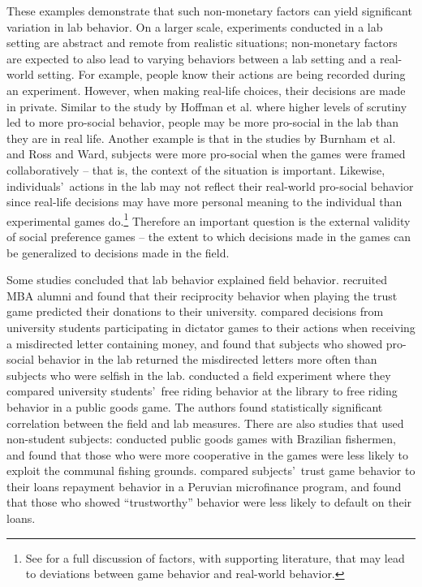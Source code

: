 \documentclass[12pt]{article}
\begin{document}
These examples demonstrate that such non-monetary factors can yield significant variation in lab behavior. On a larger scale, experiments conducted in a lab setting are abstract and remote from realistic situations; non-monetary factors are expected to also lead to varying behaviors between a lab setting and a real-world setting. For example, people know their actions are being recorded during an experiment. However, when making real-life choices, their decisions are made in private. Similar to the study by Hoffman et al. where higher levels of scrutiny led to more pro-social behavior, people may be more pro-social in the lab than they are in real life. Another example is that in the studies by Burnham et al. and Ross and Ward, subjects were more pro-social when the games were framed collaboratively -- that is, the context of the situation is important. Likewise, individuals\rq \ actions in the lab may not reflect their real-world pro-social behavior since real-life decisions may have more personal meaning to the individual than experimental games do.\footnote{See \cite{levitt_list_2007} for a full discussion of factors, with supporting literature, that may lead to deviations between game behavior and real-world behavior.} Therefore an important question is the external validity of social preference games -- the extent to which decisions made in the games can be generalized to decisions made in the field.

Some studies concluded that lab behavior explained field behavior. \cite{baran_2010} recruited MBA alumni and found that their reciprocity behavior when playing the trust game predicted their donations to their university. \cite{franzen_pointner_2012} compared decisions from university students participating in dictator games to their actions when receiving a misdirected letter containing money, and found that subjects who showed pro-social behavior in the lab returned the misdirected letters more often than subjects who were selfish in the lab. \cite{englmaier_gebhardt_2011} conducted a field experiment where they compared university students\rq \ free riding behavior at the library to free riding behavior in a public goods game. The authors found statistically significant correlation between the field and lab measures. There are also studies that used non-student subjects: \cite{fehr_leibbrandt_2011} conducted public goods games with Brazilian fishermen, and found that those who were more cooperative in the games were less likely to exploit the communal fishing grounds. \cite{karlan_2005} compared subjects\rq \ trust game behavior to their loans repayment behavior in a Peruvian microfinance program, and found that those who showed ``trustworthy'' behavior were less likely to default on their loans. 
\end{document}
